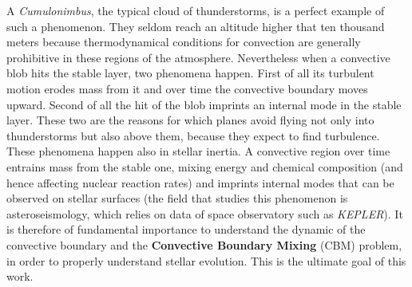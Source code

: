 A \textit{Cumulonimbus}, the typical cloud of thunderstorms, is a perfect example of such a phenomenon. They seldom reach an altitude higher that ten thousand meters because thermodynamical conditions for convection are generally prohibitive in these regions of the atmosphere. Nevertheless when a convective blob hits the stable layer, two phenomena happen. First of all its turbulent motion erodes mass from it and over time the convective boundary moves upward. Second of all the hit of the blob imprints an internal mode in the stable layer. These two are the reasons for which planes avoid flying not only into thunderstorms but also above them, because they expect to find turbulence. \\
These phenomena happen also in stellar inertia. A convective region over time entrains mass from the stable one, mixing energy and chemical composition (and hence affecting nuclear reaction rates) and imprints internal modes that can be observed on stellar surfaces (the field that studies this phenomenon is asteroseismology, which relies on data of space observatory such as \textit{KEPLER}). It is therefore of fundamental importance to understand the dynamic of the convective boundary and the \textbf{Convective Boundary Mixing} (CBM) problem, in order to properly understand stellar evolution. This is the ultimate goal of this work.

